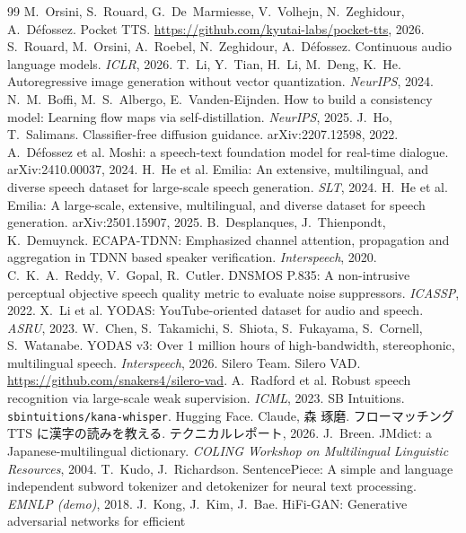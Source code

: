 \documentclass[10pt,a4paper,twocolumn]{article}
\begin{document}
\begin{thebibliography}{99}\footnotesize
\setlength{\itemsep}{0pt}
 M.~Orsini, S.~Rouard, G.~De~Marmiesse, V.~Volhejn, N.~Zeghidour, A.~Défossez.
Pocket TTS. \url{https://github.com/kyutai-labs/pocket-tts}, 2026.
 S.~Rouard, M.~Orsini, A.~Roebel, N.~Zeghidour, A.~Défossez. Continuous audio
language models. \emph{ICLR}, 2026.
 T.~Li, Y.~Tian, H.~Li, M.~Deng, K.~He. Autoregressive image generation without vector
quantization. \emph{NeurIPS}, 2024.
 N.~M.~Boffi, M.~S.~Albergo, E.~Vanden-Eijnden. How to build a consistency model:
Learning flow maps via self-distillation. \emph{NeurIPS}, 2025.
 J.~Ho, T.~Salimans. Classifier-free diffusion guidance. arXiv:2207.12598, 2022.
 A.~Défossez et al. Moshi: a speech-text foundation model for real-time dialogue.
arXiv:2410.00037, 2024.
 H.~He et al. Emilia: An extensive, multilingual, and diverse speech dataset for
large-scale speech generation. \emph{SLT}, 2024.
 H.~He et al. Emilia: A large-scale, extensive, multilingual, and diverse
dataset for speech generation. arXiv:2501.15907, 2025.
 B.~Desplanques, J.~Thienpondt, K.~Demuynck. ECAPA-TDNN: Emphasized channel
attention, propagation and aggregation in TDNN based speaker verification. \emph{Interspeech}, 2020.
 C.~K.~A.~Reddy, V.~Gopal, R.~Cutler. DNSMOS P.835: A non-intrusive perceptual
objective speech quality metric to evaluate noise suppressors. \emph{ICASSP}, 2022.
 X.~Li et al. YODAS: YouTube-oriented dataset for audio and speech. \emph{ASRU}, 2023.
 W.~Chen, S.~Takamichi, S.~Shiota, S.~Fukayama, S.~Cornell, S.~Watanabe. YODAS v3:
Over 1 million hours of high-bandwidth, stereophonic, multilingual speech. \emph{Interspeech}, 2026.
 Silero Team. Silero VAD. \url{https://github.com/snakers4/silero-vad}.
 A.~Radford et al. Robust speech recognition via large-scale weak supervision.
\emph{ICML}, 2023.
 SB Intuitions. \texttt{sbintuitions/kana-whisper}. Hugging Face.
 Claude, 森 琢磨. フローマッチング TTS に漢字の読みを教える. テクニカルレポート, 2026.
 J.~Breen. JMdict: a Japanese-multilingual dictionary. \emph{COLING Workshop on
Multilingual Linguistic Resources}, 2004.
 T.~Kudo, J.~Richardson. SentencePiece: A simple and language independent
subword tokenizer and detokenizer for neural text processing. \emph{EMNLP (demo)}, 2018.
 J.~Kong, J.~Kim, J.~Bae. HiFi-GAN: Generative adversarial networks for efficient

\end{thebibliography}
\end{document}
